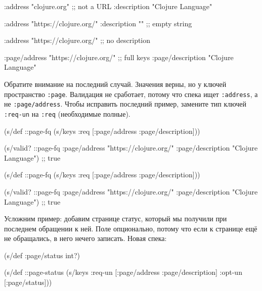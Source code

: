 \else

\begin{english}
  \begin{clojure}
{:address "clojure.org" ;; not a URL
 :description "Clojure Language"}

{:address "https://clojure.org/"
 :description ""} ;; empty string

{:address "https://clojure.org/"} ;; no description

{:page/address "https://clojure.org/" ;; full keys
 :page/description "Clojure Language"}
  \end{clojure}
\end{english}

\fi

Обратите внимание на последний случай. Значения верны, но у ключей пространство
\verb|:page|. Валидация не сработает, потому что спека ищет \verb|:address|,
а не \verb|:page/address|. Чтобы исправить последний пример, замените тип
ключей \verb|:req-un| на \verb|:req| (необходимые полные).


\ifx\devicetype\mobile

\begin{english}
  \begin{clojure}
(s/def ::page-fq
  (s/keys :req [:page/address
                :page/description]))

(s/valid? ::page-fq
  {:page/address "https://clojure.org/"
   :page/description "Clojure Language"})
;; true
  \end{clojure}
\end{english}

\else

\begin{english}
  \begin{clojure}
(s/def ::page-fq
  (s/keys :req [:page/address
                :page/description]))

(s/valid? ::page-fq
          {:page/address "https://clojure.org/"
           :page/description "Clojure Language"})
;; true
  \end{clojure}
\end{english}

\fi

Усложним пример: добавим странице статус, который мы получили при
последнем обращении к ней. Поле опционально, потому что если к странице ещё не
обращались, в него нечего записать. Новая спека:

\begin{english}
  \begin{clojure}
(s/def :page/status int?)

(s/def ::page-status
  (s/keys :req-un [:page/address
                   :page/description]
          :opt-un [:page/status]))
  \end{clojure}
\end{english}

